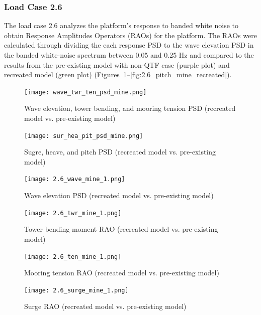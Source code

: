 \documentclass[a4paper, 11pt]{article}
\begin{document}
\subsubsection{Load Case 2.6}

\hspace*{0.5cm}The load case 2.6 analyzes the platform's response to banded white noise to obtain Response Amplitudes Operators (RAOs) for the platform. The RAOs were calculated through dividing the each response PSD to the wave elevation PSD in the banded white-noise spectrum between 0.05 and 0.25 Hz and compared to the results from the pre-existing model with non-QTF case (purple plot) and recreated model (green plot) (Figures~\ref{fig:w_t_t_p_mine_recreated}--\ref{fig:2.6_pitch_mine_recreated}).

\begin{figure}[H]
    \centering
    \texttt{[image: wave\_twr\_ten\_psd\_mine.png]}
    \caption{\small Wave elevation, tower bending, and mooring tension PSD (recreated model vs. pre-existing model)}
    \label{fig:w_t_t_p_mine_recreated}
\end{figure}

\begin{figure}[H]
    \centering
    \texttt{[image: sur\_hea\_pit\_psd\_mine.png]}
    \caption{\small Sugre, heave, and pitch PSD (recreated model vs. pre-existing model)}
    \label{fig:s_h_p_p_mine_recreated}
\end{figure}

\begin{figure}[H]
    \begin{minipage}{0.48\textwidth}
        \centering
        \texttt{[image: 2.6\_wave\_mine\_1.png]}
        \caption{\small Wave elevation PSD (recreated model vs. pre-existing model)} 
        \label{fig:2.6_wave_mine_recreated}
    \end{minipage}
    \hfill
    \begin{minipage}{0.49\textwidth}
        \centering
        \vspace{-0.3cm}
        \texttt{[image: 2.6\_twr\_mine\_1.png]}
        \caption{\small Tower bending moment RAO (recreated model vs. pre-existing model)}
        \label{fig:2.6_twr_mine_recreated}
    \end{minipage}
\end{figure}

\begin{figure}[H]
    \begin{minipage}{0.48\textwidth}
        \centering
        \texttt{[image: 2.6\_ten\_mine\_1.png]}
        \caption{\small Mooring tension RAO (recreated model vs. pre-existing model)}
        \label{fig:2.6_ten_mine_recreated}
    \end{minipage}
    \hfill
    \begin{minipage}{0.48\textwidth}
        \centering
        \texttt{[image: 2.6\_surge\_mine\_1.png]}
        \caption{\small Surge RAO (recreated model vs. pre-existing model)} 
        \label{fig:2.6_surge_mine_recreated}
    \end{minipage}
\end{figure}
\end{document}
